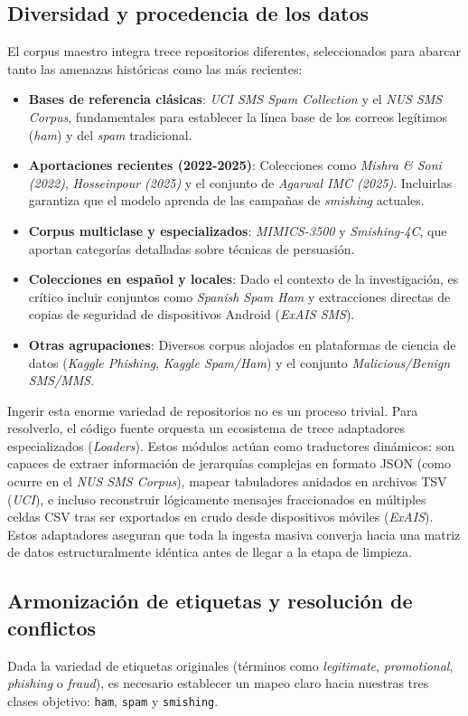 \subsection{Diversidad y procedencia de los datos}
El corpus maestro integra trece repositorios diferentes, seleccionados para abarcar tanto las amenazas históricas como las más recientes:
\begin{itemize}
    \item \textbf{Bases de referencia clásicas}: \textit{UCI SMS Spam Collection} y el \textit{NUS SMS Corpus}, fundamentales para establecer la línea base de los correos legítimos (\textit{ham}) y del \textit{spam} tradicional.
    \item \textbf{Aportaciones recientes (2022-2025)}: Colecciones como \textit{Mishra \& Soni (2022)}, \textit{Hosseinpour (2025)} y el conjunto de \textit{Agarwal IMC (2025)}. Incluirlas garantiza que el modelo aprenda de las campañas de \textit{smishing} actuales.
    \item \textbf{Corpus multiclase y especializados}: \textit{MIMICS-3500} y \textit{Smishing-4C}, que aportan categorías detalladas sobre técnicas de persuasión.
    \item \textbf{Colecciones en español y locales}: Dado el contexto de la investigación, es crítico incluir conjuntos como \textit{Spanish Spam Ham} y extracciones directas de copias de seguridad de dispositivos Android (\textit{ExAIS SMS}).
    \item \textbf{Otras agrupaciones}: Diversos corpus alojados en plataformas de ciencia de datos (\textit{Kaggle Phishing}, \textit{Kaggle Spam/Ham}) y el conjunto \textit{Malicious/Benign SMS/MMS}.
\end{itemize}

Ingerir esta enorme variedad de repositorios no es un proceso trivial. Para resolverlo, el código fuente orquesta un ecosistema de trece adaptadores especializados (\textit{Loaders}). Estos módulos actúan como traductores dinámicos: son capaces de extraer información de jerarquías complejas en formato JSON (como ocurre en el \textit{NUS SMS Corpus}), mapear tabuladores anidados en archivos TSV (\textit{UCI}), e incluso reconstruir lógicamente mensajes fraccionados en múltiples celdas CSV tras ser exportados en crudo desde dispositivos móviles (\textit{ExAIS}). Estos adaptadores aseguran que toda la ingesta masiva converja hacia una matriz de datos estructuralmente idéntica antes de llegar a la etapa de limpieza.

\subsection{Armonización de etiquetas y resolución de conflictos}
\label{subsec:armonizacion}
Dada la variedad de etiquetas originales (términos como \textit{legitimate}, \textit{promotional}, \textit{phishing} o \textit{fraud}), es necesario establecer un mapeo claro hacia nuestras tres clases objetivo: \texttt{ham}, \texttt{spam} y \texttt{smishing}.

